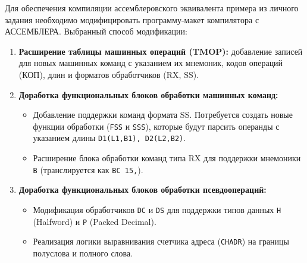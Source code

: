 \documentclass[12pt, a4paper]{article}
\begin{document}
Для обеспечения компиляции ассемблеровского эквивалента примера из личного задания необходимо модифицировать программу-макет компилятора с АССЕМБЛЕРА. Выбранный способ модификации:
\begin{enumerate}
    \item \textbf{Расширение таблицы машинных операций (TMOP):} добавление записей для новых машинных команд с указанием их мнемоник, кодов операций (КОП), длин и форматов обработчиков (RX, SS).
    \item \textbf{Доработка функциональных блоков обработки машинных команд:}
    \begin{itemize}
        \item Добавление поддержки команд формата SS. Потребуется создать новые функции обработки (\texttt{FSS} и \texttt{SSS}), которые будут парсить операнды с указанием длины \texttt{D1(L1,B1), D2(L2,B2)}.
        \item Расширение блока обработки команд типа RX для поддержки мнемоники \texttt{B} (транслируется как \texttt{BC 15,}).
    \end{itemize}
    \item \textbf{Доработка функциональных блоков обработки псевдоопераций:}
    \begin{itemize}
        \item Модификация обработчиков \texttt{DC} и \texttt{DS} для поддержки типов данных \texttt{H} (Halfword) и \texttt{P} (Packed Decimal).
        \item Реализация логики выравнивания счетчика адреса (\texttt{CHADR}) на границы полуслова и полного слова.
    \end{itemize}
\end{enumerate}
\end{document}
